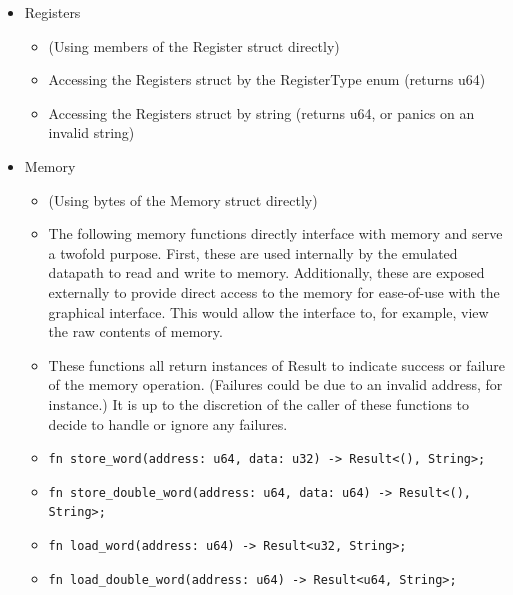 \documentclass[
    paper=letter,
    parskip=half,
    fontsize=12pt,
    titlepage=firstiscover,
    toc=bibliography,
    numbers=endperiod
]{scrartcl}
\providecommand{\tightlist}{%
  \setlength{\itemsep}{0pt}\setlength{\parskip}{0pt}}
\begin{document}
\begin{itemize}
    \item Registers
          \begin{itemize}
              \tightlist
              \item (Using members of the Register struct directly)
              \item Accessing the Registers struct by the RegisterType enum (returns u64)
              \item Accessing the Registers struct by string (returns u64, or panics on an
                    invalid string)
          \end{itemize}

    \item Memory
          \begin{itemize}
              \tightlist
              \item (Using bytes of the Memory struct directly)
              \item The following memory functions directly interface with memory and serve
                    a twofold purpose. First, these are used internally by the emulated
                    datapath to read and write to memory. Additionally, these are exposed
                    externally to provide direct access to the memory for ease-of-use with
                    the graphical interface. This would allow the interface to, for example,
                    view the raw contents of memory.
              \item These functions all return instances of Result to indicate success or
                    failure of the memory operation. (Failures could be due to an invalid
                    address, for instance.) It is up to the discretion of the caller of
                    these functions to decide to handle or ignore any failures.
              \item \texttt{fn store\_word(address: u64, data: u32) -\textgreater{} Result\textless(), String\textgreater;}
              \item \texttt{fn store\_double\_word(address: u64, data: u64) -\textgreater{} Result\textless(), String\textgreater;}
              \item \texttt{fn load\_word(address: u64) -\textgreater{} Result\textless u32, String\textgreater;}
              \item \texttt{fn load\_double\_word(address: u64) -\textgreater{} Result\textless u64, String\textgreater;}
          \end{itemize}
\end{itemize}
\end{document}
